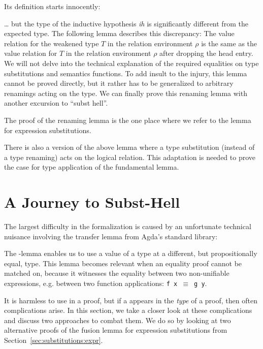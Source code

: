 \documentclass[acmsmall,anonymous,review,screen]{acmart}
\begin{document}
Its definition starts innocently:
\LRVrenMCGLookupBody

{\dots} but the type of the inductive hypothesis \textit{ih} is
significantly different from the expected type.
The following lemma describes this discrepancy: The value relation for
the weakened type $T$ in the relation environment $\rho$ is the same
as the value relation for $T$ in the relation environment $\rho$ after
dropping the head entry. We will not delve into the technical
explanation of the required equalities on type substitutions and
semantics functions.
\LRVrenLRVwk
To add insult to the injury, this lemma cannot be proved directly, but
it rather has to be generalized to arbitrary renamings acting on the
type.
We can finally prove this renaming lemma with another excursion to
``subst hell''.
\LRVrenLRVrenEqType

The proof of the renaming lemma is the one place where we refer to the
lemma {\AFusionESubESub} for expression substitutions.

There is also a version {\ALRVsub} of the above lemma where a type substitution
(instead of a type renaming) acts on the logical relation. This
adaptation is needed to prove the case for type application of the
fundamental lemma.

\section{A Journey to Subst-Hell}
\label{sec:subst-hell}

The largest difficulty in the formalization is caused by an unfortunate
technical nuisance involving the transfer lemma {\Asubst} from Agda's standard library:

\SubstExamplesDef

The {\Asubst}-lemma enables us to use a value of a type at a different,
but propositionally equal, type.
This lemma becomes relevant when an equality proof cannot be matched
on, because it witnesses the equality between two non-unifiable
expressions, e.g. between two function applications: \texttt{f x $\equiv$ g y}.

It is harmless to use {\Asubst} in a proof, but if a {\Asubst} appears
in the \emph{type} of a proof, then often complications arise.
In this section, we take a closer look at these complications and
discuss two approaches to combat them. We do so by looking at two
alternative proofs of the fusion lemma for expression substitutions from
Section~\ref{sec:substitutions:expr}.
\end{document}
